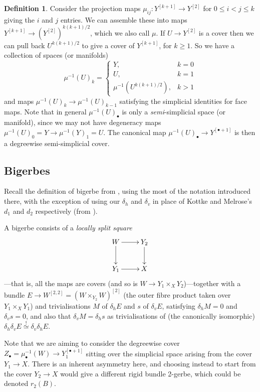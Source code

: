 \documentclass[12pt]{amsart}
\theoremstyle{plain}
\theoremstyle{definition}
\newtheorem{definition}[theorem]{Definition}
\theoremstyle{remark}
\numberwithin{equation}{section}
\newcommand{\<}{\langle}
\renewcommand{\>}{\rangle}
\begin{document}
\begin{definition}
Consider the projection maps $\mu_{ij} \colon Y^{[k+1]} \to Y^{[2]}$ for $0\leq i<j \leq k$ giving the $i$ and $j$ entries.
We can assemble these into maps $Y^{[k+1]} \to \left(Y^{[2]}\right)^{k(k+1)/2}$, which we also call $\mu$. 
If $U \to Y^{[2]}$ is a cover then we can pull back $U^{k(k+1)/2}$ to give a cover of $Y^{[k+1]}$, for $k \geq 1$. 
So we have a collection of spaces (or manifolds)
\[
\mu^{-1}(U)_k = 
            \begin{cases} 
                Y, & k = 0\\ 
                U, & k=1\\ 
                \mu^{-1}(U^{k(k+1)/2}), & k >1 
            \end{cases}
\]
and maps $\mu^{-1}(U)_k \to \mu^{-1}(U)_{k-1}$ satisfying the simplicial identities for face maps. 
Note that in general $\mu^{-1}(U)_\bullet$ is only a {\em semi}-simplicial space (or manifold), since we may not have degeneracy maps $\mu^{-1}(U)_0 = Y \to \mu^{-1}(Y)_1 = U$.  
The canonical map $\mu^{-1}(U)_\bullet \to Y^{[\bullet+1]}$ is then a degreewise semi-simplicial cover.  
\end{definition}


\subsection{Bigerbes}


Recall the definition of bigerbe from \cite[Definition 4.5]{KM19}, using the most of the notation introduced there, with the exception of using our $\delta_h$ and $\delta_v$ in place of Kottke and Melrose's $d_1$ and $d_2$ respectively (from \cite[start of \S 4.2]{KM19}).

A bigerbe consists of a \emph{locally split square}
\[
    \xymatrix{
        W \ar[r] \ar[d] & Y_2 \ar[d] \\
        Y_1 \ar[r] & X
    }
\]
---that is, all the maps are covers (and so is $W\to Y_1\times_X Y_2$)---together with a bundle $E\to W^{[2,2]} = (W\times_{Y_2}W)^{[2]}$ (the outer fibre product taken over $Y_1\times_X Y_1$) and trivialisations $M$ of $\delta_h E$ and $s$ of $\delta_v E$, satisfying $\delta_h M=0$ and $\delta_v s = 0$, and also that $\delta_v M = \delta_h s$ as trivialisations of (the canonically isomorphic) $\delta_h \delta_v E \stackrel{!}{\simeq} \delta_v \delta_h E$.

Note that  we are aiming to consider the degreewise cover $Z_\bullet = \mu^{-1}_\bullet(W) \to Y_1^{[\bullet + 1]}$ sitting over the simplicial space arising from the cover $Y_1\to X$. 
There is an inherent asymmetry here, and choosing instead to start from the cover $Y_2\to X$ would give a different rigid bundle 2-gerbe, which could be denoted $r_2(B)$.
\end{document}

